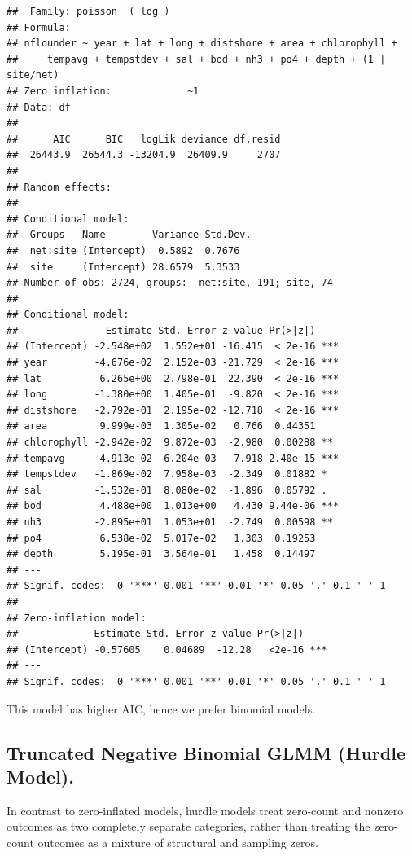 \documentclass[
]{article}
\begin{document}
\begin{verbatim}
##  Family: poisson  ( log )
## Formula:          
## nflounder ~ year + lat + long + distshore + area + chlorophyll +  
##     tempavg + tempstdev + sal + bod + nh3 + po4 + depth + (1 |      site/net)
## Zero inflation:             ~1
## Data: df
## 
##      AIC      BIC   logLik deviance df.resid 
##  26443.9  26544.3 -13204.9  26409.9     2707 
## 
## Random effects:
## 
## Conditional model:
##  Groups   Name        Variance Std.Dev.
##  net:site (Intercept)  0.5892  0.7676  
##  site     (Intercept) 28.6579  5.3533  
## Number of obs: 2724, groups:  net:site, 191; site, 74
## 
## Conditional model:
##               Estimate Std. Error z value Pr(>|z|)    
## (Intercept) -2.548e+02  1.552e+01 -16.415  < 2e-16 ***
## year        -4.676e-02  2.152e-03 -21.729  < 2e-16 ***
## lat          6.265e+00  2.798e-01  22.390  < 2e-16 ***
## long        -1.380e+00  1.405e-01  -9.820  < 2e-16 ***
## distshore   -2.792e-01  2.195e-02 -12.718  < 2e-16 ***
## area         9.999e-03  1.305e-02   0.766  0.44351    
## chlorophyll -2.942e-02  9.872e-03  -2.980  0.00288 ** 
## tempavg      4.913e-02  6.204e-03   7.918 2.40e-15 ***
## tempstdev   -1.869e-02  7.958e-03  -2.349  0.01882 *  
## sal         -1.532e-01  8.080e-02  -1.896  0.05792 .  
## bod          4.488e+00  1.013e+00   4.430 9.44e-06 ***
## nh3         -2.895e+01  1.053e+01  -2.749  0.00598 ** 
## po4          6.538e-02  5.017e-02   1.303  0.19253    
## depth        5.195e-01  3.564e-01   1.458  0.14497    
## ---
## Signif. codes:  0 '***' 0.001 '**' 0.01 '*' 0.05 '.' 0.1 ' ' 1
## 
## Zero-inflation model:
##             Estimate Std. Error z value Pr(>|z|)    
## (Intercept) -0.57605    0.04689  -12.28   <2e-16 ***
## ---
## Signif. codes:  0 '***' 0.001 '**' 0.01 '*' 0.05 '.' 0.1 ' ' 1
\end{verbatim}

This model has higher AIC, hence we prefer binomial models.

\subsection{Truncated Negative Binomial GLMM (Hurdle
Model).}\label{truncated-negative-binomial-glmm-hurdle-model.}

In contrast to zero-inflated models, hurdle models treat zero-count and
nonzero outcomes as two completely separate categories, rather than
treating the zero-count outcomes as a mixture of structural and sampling
zeros.
\end{document}
